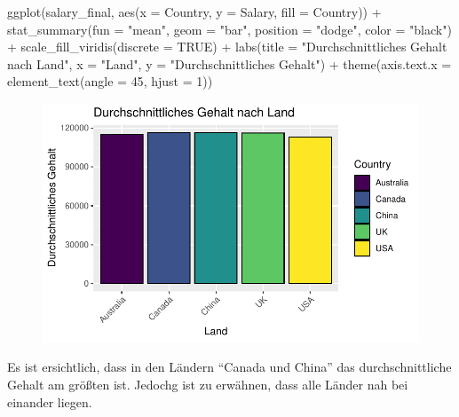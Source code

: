 \documentclass[
  letterpaper,
  DIV=11,
  numbers=noendperiod]{scrartcl}
\newenvironment{Shaded}{\begin{snugshade}}{\end{snugshade}}
\newcommand{\AttributeTok}[1]{\textcolor[rgb]{0.40,0.45,0.13}{#1}}
\newcommand{\ConstantTok}[1]{\textcolor[rgb]{0.56,0.35,0.01}{#1}}
\newcommand{\DecValTok}[1]{\textcolor[rgb]{0.68,0.00,0.00}{#1}}
\newcommand{\FunctionTok}[1]{\textcolor[rgb]{0.28,0.35,0.67}{#1}}
\newcommand{\NormalTok}[1]{\textcolor[rgb]{0.00,0.23,0.31}{#1}}
\newcommand{\SpecialCharTok}[1]{\textcolor[rgb]{0.37,0.37,0.37}{#1}}
\newcommand{\StringTok}[1]{\textcolor[rgb]{0.13,0.47,0.30}{#1}}
\begin{document}
\begin{Shaded}
\begin{Highlighting}[]
\FunctionTok{ggplot}\NormalTok{(salary\_final, }\FunctionTok{aes}\NormalTok{(}\AttributeTok{x =}\NormalTok{ Country, }\AttributeTok{y =}\NormalTok{ Salary, }\AttributeTok{fill =}\NormalTok{ Country)) }\SpecialCharTok{+}
  \FunctionTok{stat\_summary}\NormalTok{(}\AttributeTok{fun =} \StringTok{"mean"}\NormalTok{, }\AttributeTok{geom =} \StringTok{"bar"}\NormalTok{, }\AttributeTok{position =} \StringTok{"dodge"}\NormalTok{, }\AttributeTok{color =} \StringTok{"black"}\NormalTok{) }\SpecialCharTok{+}
  \FunctionTok{scale\_fill\_viridis}\NormalTok{(}\AttributeTok{discrete =} \ConstantTok{TRUE}\NormalTok{) }\SpecialCharTok{+}
  \FunctionTok{labs}\NormalTok{(}\AttributeTok{title =} \StringTok{"Durchschnittliches Gehalt nach Land"}\NormalTok{,}
       \AttributeTok{x =} \StringTok{"Land"}\NormalTok{,}
       \AttributeTok{y =} \StringTok{"Durchschnittliches Gehalt"}\NormalTok{) }\SpecialCharTok{+}
  \FunctionTok{theme}\NormalTok{(}\AttributeTok{axis.text.x =} \FunctionTok{element\_text}\NormalTok{(}\AttributeTok{angle =} \DecValTok{45}\NormalTok{, }\AttributeTok{hjust =} \DecValTok{1}\NormalTok{))}
\end{Highlighting}
\end{Shaded}

\begin{figure}[H]

{\centering \includegraphics{main_doc_files/figure-pdf/unnamed-chunk-31-1.pdf}

}

\end{figure}

Es ist ersichtlich, dass in den Ländern ``Canada und China'' das
durchschnittliche Gehalt am größten ist. Jedochg ist zu erwähnen, dass
alle Länder nah bei einander liegen.
\end{document}
